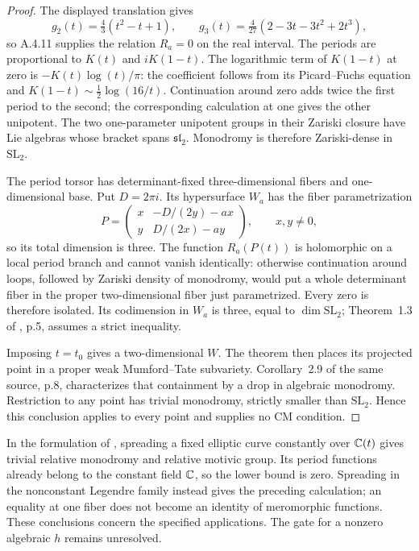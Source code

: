 \begin{proof}
The displayed translation gives
\[
 g_2(t)=\tfrac43(t^2-t+1),\qquad
 g_3(t)=\tfrac4{27}(2-3t-3t^2+2t^3),
\]
so A.4.11 supplies the relation $R_a=0$ on the real interval. The periods are proportional to $K(t)$ and $iK(1-t)$. The logarithmic term of $K(1-t)$ at zero is $-K(t)\log(t)/\pi$: the coefficient follows from its Picard--Fuchs equation and $K(1-t)\sim\tfrac12\log(16/t)$. Continuation around zero adds twice the first period to the second; the corresponding calculation at one gives the other unipotent. The two one-parameter unipotent groups in their Zariski closure have Lie algebras whose bracket spans $\mathfrak{sl}_2$. Monodromy is therefore Zariski-dense in $\mathrm{SL}_2$.

The period torsor has determinant-fixed three-dimensional fibers and one-dimensional base. Put $D=2\pi i$. Its hypersurface $W_a$ has the fiber parametrization
\[
 P=\begin{pmatrix}
 x&-D/(2y)-ax\\y&D/(2x)-ay
 \end{pmatrix},\qquad x,y\ne0,
\]
so its total dimension is three. The function $R_a(P(t))$ is holomorphic on a local period branch and cannot vanish identically: otherwise continuation around loops, followed by Zariski density of monodromy, would put a whole determinant fiber in the proper two-dimensional fiber just parametrized. Every zero is therefore isolated. Its codimension in $W_a$ is three, equal to $\dim\mathrm{SL}_2$; Theorem~1.3 of \cite{EllBakkerTsimerman2025}, p.5, assumes a strict inequality.

Imposing $t=t_0$ gives a two-dimensional $W$. The theorem then places its projected point in a proper weak Mumford--Tate subvariety. Corollary~2.9 of the same source, p.8, characterizes that containment by a drop in algebraic monodromy. Restriction to any point has trivial monodromy, strictly smaller than $\mathrm{SL}_2$. Hence this conclusion applies to every point and supplies no CM condition.
\end{proof}

In the formulation of \cite[Theorem 4.25, p.18]{EllBakkerTsimerman2025}, spreading a fixed elliptic curve constantly over $\mathbb C(t)$ gives trivial relative monodromy and relative motivic group. Its period functions already belong to the constant field $\mathbb C$, so the lower bound is zero. Spreading in the nonconstant Legendre family instead gives the preceding calculation; an equality at one fiber does not become an identity of meromorphic functions. These conclusions concern the specified applications. The gate for a nonzero algebraic $h$ remains unresolved.

